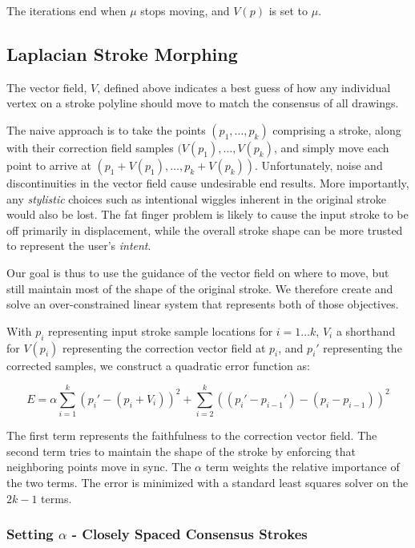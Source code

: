 The iterations end when $\mu$ stops moving, and $V(p)$ is set to $\mu$.

\subsection{Laplacian Stroke Morphing}


The vector field, $V$, defined above indicates a best guess of how any individual vertex on a stroke polyline should move to match the consensus of all drawings.

The naive approach is to take the points $(p_1, \ldots, p_k)$ comprising a stroke, along with their correction field samples $(V(p_1), \ldots, V(p_k)$, and simply move each point to arrive at $(p_1 + V(p_1), \ldots, p_k + V(p_k))$.  Unfortunately, noise and discontinuities in the vector field cause undesirable end results. More importantly, any {\em stylistic} choices such as intentional wiggles inherent in the original stroke would also be lost. The fat finger problem is likely to cause the input stroke to be off primarily in displacement, while the overall stroke shape can be more trusted to represent the user's {\em intent}.

Our goal is thus to use the guidance of the vector field on where to move, but still maintain most of the shape of the original stroke.  We therefore create and solve an over-constrained linear system that represents both of those objectives.

With $p_i$ representing input stroke sample locations for $i=1\ldots k$, $V_i$ a shorthand for $V(p_i)$ representing the correction vector field at $p_i$, and $p_i'$ representing the corrected samples, we construct a quadratic error function as:

\begin{equation}
E = \alpha \sum_{i=1}^k (p_i' - (p_i + V_i))^2 +  \sum_{i=2}^k ((p_i' - p_{i-1}') - (p_i - p_{i-1}))^2
\end{equation}

The first term represents the faithfulness to the correction vector field. The second term tries to maintain the shape of the stroke by enforcing that neighboring points move in sync. The $\alpha$ term weights the relative importance of the two terms. The error is minimized with a standard least squares solver on the $2k-1$ terms.

\subsubsection{Setting $\alpha$ - Closely Spaced Consensus Strokes}

